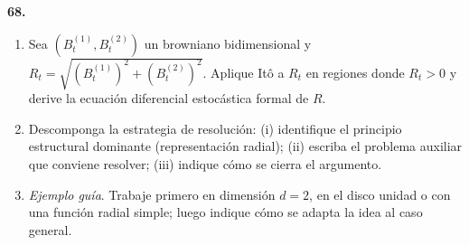 \documentclass[11pt, letterpaper]{article}
\begin{document}
\begin{ejercicio}
    \textbf{68.} 
    \begin{enumerate}
        \item Sea $(B_{t}^{(1)}, B_{t}^{(2)})$ un browniano bidimensional y $R_{t} = \sqrt{(B_{t}^{(1)})^{2} + (B_{t}^{(2)})^{2}}$. Aplique Itô a $R_{t}$ en regiones donde $R_{t} > 0$ y derive la ecuación diferencial estocástica formal de $R$.
        \item Descomponga la estrategia de resolución: (i) identifique el principio estructural dominante (representación radial); (ii) escriba el problema auxiliar que conviene resolver; (iii) indique cómo se cierra el argumento.
        \item \textit{Ejemplo guía}. Trabaje primero en dimensión $d=2$, en el disco unidad o con una función radial simple; luego indique cómo se adapta la idea al caso general.
    \end{enumerate}
\end{ejercicio}

\vspace{5mm}
\end{document}
